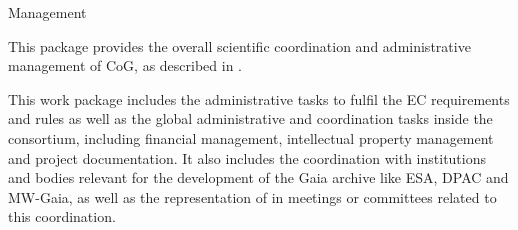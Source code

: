 
\begin{workpackage}{Management}
  \label{wp:management} %

  \wpend{\duration} %


  \makewptable %

  \begin{wpobjectives}
    This package provides the overall scientific coordination and administrative management of CoG, as described in .
  \end{wpobjectives}

  \begin{wpdescription}

    This work package includes the administrative tasks to fulfil the EC requirements and rules as
    well as the global administrative and coordination tasks inside the consortium, including financial
    management, intellectual property management and project documentation. It also includes the
    coordination with institutions and bodies relevant for the development of the Gaia archive like
    ESA, DPAC and MW-Gaia, as well as the representation of {\acro} in meetings or committees
    related to this coordination.

  \end{wpdescription}


\end{workpackage}
